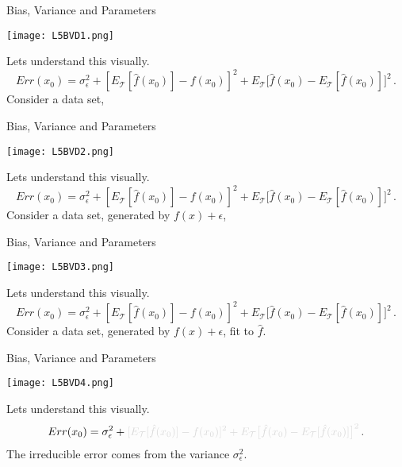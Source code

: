 \documentclass[10pt, table, dvipsnames,handout]{beamer}
\newcommand{\cT}{\ensuremath{\mathcal{T}}}
\begin{document}
\begin{frame}[fragile]{Bias, Variance and Parameters}
  \begin{minipage}[t][0.6\textheight][t]{\textwidth}
	  \centering \texttt{[image: L5BVD1.png]}
  \end{minipage}
  \vfill
  \begin{minipage}[t][0.4\textheight][t]{\textwidth}
Lets understand this visually.
$$
Err(x_0) = \sigma_\epsilon^2 + [E_\cT[\hat f(x_0)] - f(x_0)]^2 + E_\cT\big[ \hat{f}(x_0) - E_\cT[\hat{f}(x_0)] \big]^2\,.
$$\pause
Consider a data set, 
\end{minipage}
\end{frame}

\begin{frame}[fragile]{Bias, Variance and Parameters}
  \begin{minipage}[t][0.6\textheight][t]{\textwidth}
	  \centering \texttt{[image: L5BVD2.png]}
  \end{minipage}
  \vfill
  \begin{minipage}[t][0.4\textheight][t]{\textwidth}
Lets understand this visually.
$$
Err(x_0) = \sigma_\epsilon^2 + [E_\cT[\hat f(x_0)] - f(x_0)]^2 + E_\cT\big[ \hat{f}(x_0) - E_\cT[\hat{f}(x_0)] \big]^2\,.
$$
Consider a data set, generated by $f(x) + \epsilon$,
\end{minipage}
\end{frame}


\begin{frame}[fragile]{Bias, Variance and Parameters}
  \begin{minipage}[t][0.6\textheight][t]{\textwidth}
	  \centering \texttt{[image: L5BVD3.png]}
  \end{minipage}
  \vfill
  \begin{minipage}[t][0.4\textheight][t]{\textwidth}
Lets understand this visually.
$$
Err(x_0) = \sigma_\epsilon^2 + [E_\cT[\hat f(x_0)] - f(x_0)]^2 + E_\cT\big[ \hat{f}(x_0) - E_\cT[\hat{f}(x_0)] \big]^2\,.
$$
Consider a data set, generated by $f(x) + \epsilon$, fit to $\hat{f}$. 
\end{minipage}
\end{frame}


\begin{frame}[fragile]{Bias, Variance and Parameters}
  \begin{minipage}[t][0.6\textheight][t]{\textwidth}
	  \centering \texttt{[image: L5BVD4.png]}
  \end{minipage}
  \vfill
  \begin{minipage}[t][0.4\textheight][t]{\textwidth}
Lets understand this visually.
$$
Err(x_0) = \sigma_\epsilon^2 + {\color{gray!30}[E_\cT[\hat f(x_0)] - f(x_0)]^2 + E_\cT\big[ \hat{f}(x_0) - E_\cT[\hat{f}(x_0)] \big]^2}\,.
$$
The irreducible error comes from the variance $\sigma^2_\epsilon$. 
\end{minipage}
\end{frame}
\end{document}

